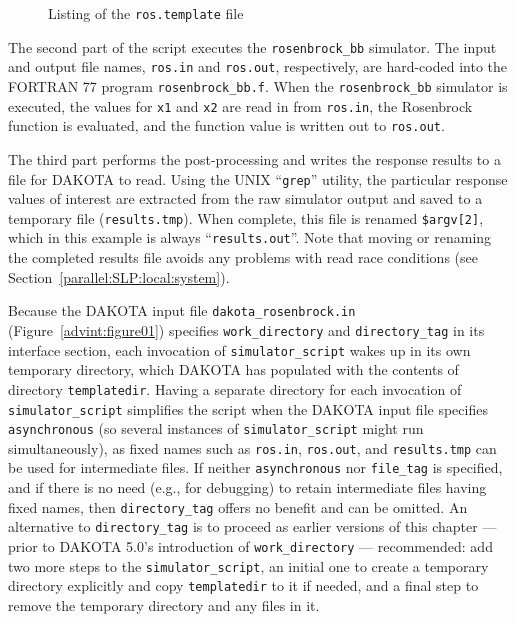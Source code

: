 \begin{figure}
  \centering
  \begin{bigbox}
    \begin{small}
    \end{small}
  \end{bigbox}
  \caption{Listing of the \texttt{ros.template} file}
  \label{advint:figure04}
\end{figure}

The second part of the script executes the \texttt{rosenbrock\_bb}
simulator. The input and output file names, \texttt{ros.in} and
\texttt{ros.out}, respectively, are hard-coded into the FORTRAN 77
program \texttt{rosenbrock\_bb.f}. When the \texttt{rosenbrock\_bb}
simulator is executed, the values for \texttt{x1} and \texttt{x2} are
read in from \texttt{ros.in}, the Rosenbrock function is evaluated,
and the function value is written out to \texttt{ros.out}.

The third part performs the post-processing and writes the response
results to a file for DAKOTA to read. Using the UNIX ``\texttt{grep}'' utility, the
particular response values of interest are extracted from the raw
simulator output and saved to a temporary file (\texttt{results.tmp}).
When complete, this file is renamed \texttt{\$argv[2]}, which in this
example is always ``\texttt{results.out}''.
Note that moving or renaming the completed results file
avoids any problems with read race
conditions (see Section~\ref{parallel:SLP:local:system}).


Because the DAKOTA input file \texttt{dakota\_rosenbrock.in}
(Figure~\ref{advint:figure01}) specifies
\texttt{work\_directory} and \texttt{directory\_tag} in its interface
section, each invocation of \texttt{simulator\_script} wakes up in
its own temporary directory, which DAKOTA has populated with the
contents of directory \texttt{templatedir}.  Having a separate directory
for each invocation of \texttt{simulator\_script} simplifies the script
when the DAKOTA input file specifies \texttt{asynchronous} (so
several instances of \texttt{simulator\_script} might run simultaneously),
as fixed names such as \texttt{ros.in}, \texttt{ros.out}, and \texttt{results.tmp}
can be used for intermediate files.  If neither \texttt{asynchronous} nor
\texttt{file\_tag} is specified, and if there is no need (e.g., for debugging)
to retain intermediate files having fixed names, then \texttt{directory\_tag}
offers no benefit and can be omitted.  An alternative to \texttt{directory\_tag}
is to proceed as earlier versions of this chapter --- prior to DAKOTA 5.0's
introduction of \texttt{work\_directory} --- recommended:  add two more
steps to the \texttt{simulator\_script},
an initial one to create a temporary directory explicitly and
copy \texttt{templatedir} to it if needed, and a final step to remove the temporary
directory and any files in it.

